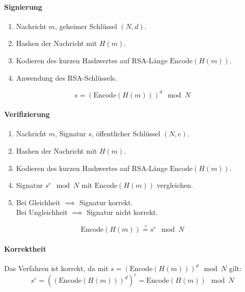 \documentclass[a4paper, 11pt, accentcolor = tud3b]{tudreport}
\begin{document}
                \paragraph{Signierung}
	                \begin{enumerate}
	                	\item[] Nachricht \(m\), geheimer Schlüssel \((N, d)\).
	                	\item Hashen der Nachricht mit \(H(m)\).
	                	\item Kodieren des kurzen Hashwertes auf RSA-Länge \(\text{Encode}(H(m))\).
	                	\item Anwendung des RSA-Schlüssels.
	                \end{enumerate}
	                \begin{equation*}
		                s = (\text{Encode}(H(m))) ^ d \mod N
	                \end{equation*}
                
                \paragraph{Verifizierung}
	                \begin{enumerate}
	                	\item[] Nachricht \(m\), Signatur \(s\), öffentlicher Schlüssel \((N, e)\).
	                	\item Hashen der Nachricht mit \(H(m)\).
	                	\item Kodieren des kurzen Hashwertes auf RSA-Länge \(\text{Encode}(H(m))\).
	                	\item Signatur \( s^e \mod N \) mit \(\text{Encode}(H(m))\) vergleichen.
	                	\item Bei Gleichheit \(\implies\) Signatur korrekt. \\
	                	      Bei Ungleichheit \(\implies\) Signatur nicht korrekt.
	                \end{enumerate}
	                \begin{equation*}
		                \text{Encode}(H(m)) \overset{?}{=} s ^ e \mod N
	                \end{equation*}
                
                \paragraph{Korrektheit}
	                Das Verfahren ist korrekt, da mit \( s = (\text{Encode}(H(m))) ^ d \mod N \) gilt:
	                \begin{equation*}
		                s^e = ((\text{Encode}(H(m))) ^ d) ^ e = \text{Encode}(H(m)) \mod N
	                \end{equation*}
\end{document}
